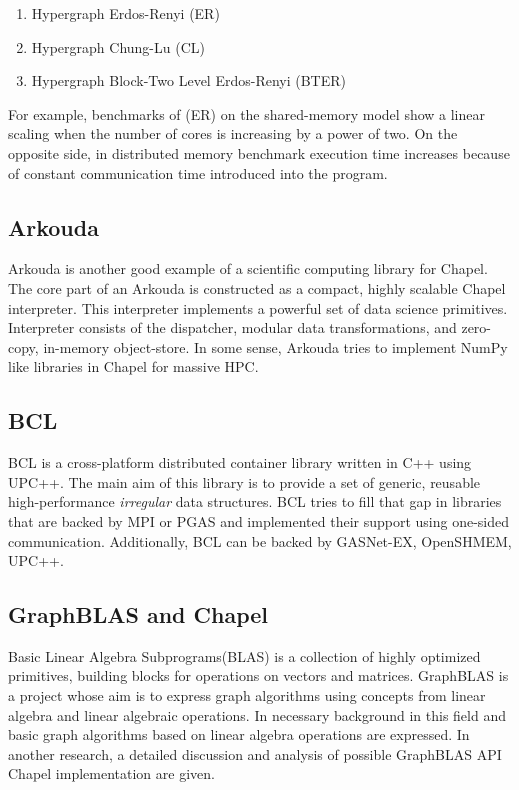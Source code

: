 \documentclass[14pt]{extreport}
\begin{document}
\begin{enumerate}
	\item Hypergraph Erdos-Renyi (ER)
	\item Hypergraph Chung-Lu (CL)
	\item Hypergraph Block-Two Level Erdos-Renyi (BTER)
\end{enumerate}

For example, benchmarks of (ER) on the shared-memory model show a linear scaling when the number of cores is increasing by a power of two. On the opposite side, in distributed memory benchmark execution time increases because of constant communication time introduced into the program.

\subsection{Arkouda}
Arkouda\cite{arkouda} is another good example of a scientific computing library for Chapel. The core part of an Arkouda is constructed as a compact, highly scalable Chapel interpreter. This interpreter implements a powerful set of data science primitives. Interpreter consists of the dispatcher, modular data transformations, and zero-copy, in-memory object-store. In some sense, Arkouda tries to implement NumPy like libraries in Chapel for massive HPC.

\subsection{BCL}
BCL\cite{bcl} is a cross-platform distributed container library written in C++ using UPC++. The main aim of this library is to provide a set of generic, reusable high-performance \textit{irregular} data structures. BCL tries to fill that gap in libraries that are backed by MPI or PGAS and implemented their support using one-sided communication. Additionally, BCL can be backed by GASNet-EX, OpenSHMEM, UPC++. 

\subsection{GraphBLAS and Chapel}
Basic Linear Algebra Subprograms(BLAS)\cite{blas} is a collection of highly optimized primitives, building blocks for operations on vectors and matrices. GraphBLAS\cite{graphblasmath} is a project whose aim is to express graph algorithms using concepts from linear algebra and linear algebraic operations. In \cite{graphlinalg} necessary background in this field and basic graph algorithms based on linear algebra operations are expressed. In another research, \cite{azadb17a} a detailed discussion and analysis of possible GraphBLAS API Chapel implementation are given.

\printbibliography
\end{document}
